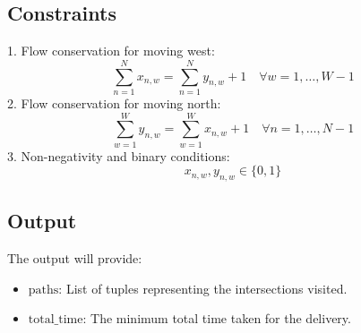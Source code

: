 \documentclass{article}
\begin{document}
\subsection*{Constraints}
1. Flow conservation for moving west:
\[
\sum_{n=1}^{N} x_{n,w} = \sum_{n=1}^{N} y_{n,w} + 1 \quad \forall w = 1, \ldots, W-1
\]
2. Flow conservation for moving north:
\[
\sum_{w=1}^{W} y_{n,w} = \sum_{w=1}^{W} x_{n,w} + 1 \quad \forall n = 1, \ldots, N-1
\]
3. Non-negativity and binary conditions:
\[
x_{n,w}, y_{n,w} \in \{0, 1\}
\]

\subsection*{Output}
The output will provide:
\begin{itemize}
    \item \( \text{paths} \): List of tuples representing the intersections visited.
    \item \( \text{total\_time} \): The minimum total time taken for the delivery.
\end{itemize}
\end{document}
